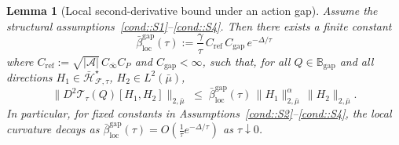 \documentclass{article}
\newcommand{\loc}{\mathrm{loc}}
\theoremstyle{plain}
\newtheorem{lemma}{Lemma}
\theoremstyle{definition}
\theoremstyle{remark}
\begin{document}
\begin{lemma}[Local second-derivative bound under an action gap]
\label{lem:second-derivative-gap}
Assume the structural assumptions~\ref{cond::S1}--\ref{cond::S4}. Then there
exists a finite constant
\[
\bar\beta_{\loc}^{\mathrm{gap}}(\tau)
:=
\frac{\gamma}{\tau}\,
C_{\mathrm{ref}}\,C_{\mathrm{gap}}\,e^{-\Delta/\tau}
\]
where $C_{\mathrm{ref}}:=\sqrt{|\mathcal A|}\,C_{\bar\infty}C_P$ and
$C_{\mathrm{gap}}<\infty$, such that, for all
$Q\in\mathbb B_{\mathrm{gap}}$ and all directions
$H_1\in\bar{\mathcal H}_{\mathcal F,\tau}^\star$,
$H_2\in L^2(\bar\mu)$,
\begin{equation}
\label{eq:second-derivative-op-bound-gap}
\bigl\|D^2\mathcal{T}_\tau(Q)[H_1,H_2]\bigr\|_{2,\bar\mu}
\;\le\;
\bar\beta_{\loc}^{\mathrm{gap}}(\tau)\,
\|H_1\|_{2,\bar\mu}^{\alpha}\,
\|H_2\|_{2,\bar\mu}.
\end{equation}
In particular, for fixed constants in Assumptions~\ref{cond::S2}--\ref{cond::S4},
the local curvature decays as
$\bar\beta_{\loc}^{\mathrm{gap}}(\tau)
= O\!\left(\tfrac{1}{\tau}e^{-\Delta/\tau}\right)$ as $\tau\downarrow 0$.
\end{lemma}
\end{document}
